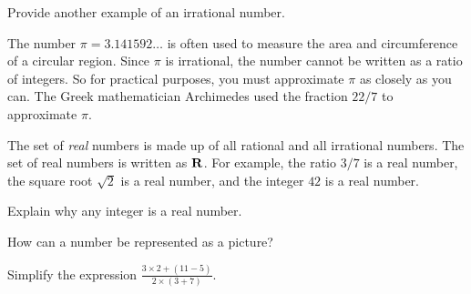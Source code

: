 \documentclass[a4paper,oneside,12pt]{article}
\begin{document}
\begin{exercise}
Provide another example of an irrational number.
\end{exercise}


The number $\pi = 3.141592\dots$ is often used to measure the area and
circumference of a circular region.  Since $\pi$ is irrational, the
number cannot be written as a ratio of integers.  So for practical
purposes, you must approximate $\pi$ as closely as you can.  The Greek
mathematician Archimedes used the fraction $22 / 7$ to approximate
$\pi$.

The set of \emph{real} numbers is made up of all rational and all
irrational numbers.  The set of real numbers is written as $\mathbf{R}$.  For
example, the ratio $3/7$ is a real number, the square root $\sqrt{2}$
is a real number, and the integer $42$ is a real number.

\begin{exercise}
Explain why any integer is a real number.
\end{exercise}


\begin{exercise}
How can a number be represented as a picture?
\end{exercise}


\begin{exercise}
Simplify the expression
$\displaystyle{
  \frac{
    3 \times 2 + (11 - 5)
  }{
    2 \times (3 + 7)
  }
}$.
\end{exercise}

\end{document}
